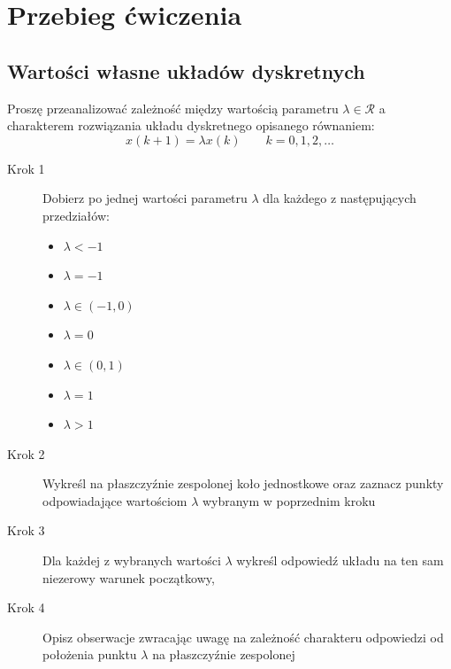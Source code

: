 \documentclass{sprawozdanie-agh}
\begin{document}
\section{Przebieg ćwiczenia}

\subsection{Wartości własne układów dyskretnych}
Proszę przeanalizować zależność między wartością parametru $\lambda \in \mathcal{R}$ a charakterem rozwiązania układu dyskretnego opisanego równaniem:
\begin{equation*}
x(k+1) = \lambda x(k) \qquad k = 0, 1, 2, \ldots
\end{equation*} 
\begin{description}

\item[Krok 1] Dobierz po jednej wartości parametru $\lambda$ dla każdego z następujących przedziałów:
\begin{itemize}
    \item $\lambda < -1$
    \item $\lambda = -1$
    \item $\lambda \in (-1,0)$
    \item $\lambda = 0$
    \item $\lambda \in (0,1)$
    \item $\lambda = 1$
    \item $\lambda > 1$
\end{itemize}
\item[Krok 2] Wykreśl na płaszczyźnie zespolonej koło jednostkowe oraz zaznacz punkty odpowiadające wartościom $\lambda$ wybranym w poprzednim kroku
\item[Krok 3] Dla każdej z wybranych wartości $\lambda$ wykreśl odpowiedź układu na ten sam niezerowy warunek początkowy,
\item[Krok 4] Opisz obserwacje zwracając uwagę na zależność charakteru odpowiedzi od położenia punktu $\lambda$ na płaszczyźnie zespolonej
\end{description}
\end{document}

